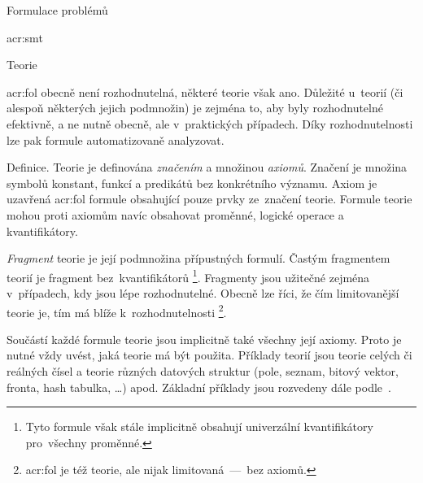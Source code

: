 \documentclass[thesis=M,czech]{FITthesis}[2012/06/26]
\newcommand{\acrlabel}[1]{acr:#1}
\newcommand{\acr}[1]{\acrshort{\acrlabel{#1}}}
\newcommand{\acrf}[1]{\acrfull{\acrlabel{#1}}}
\newcommand{\hl}[1]{\textit{#1}}
\newcommand{\name}[1]{\hl{#1}}
\newcommand{\cit}[1]{\cite{#1}}
\begin{document}
\begin{section}{Formulace problémů}
\begin{subsection}{\acrf{smt}}
\begin{subsubsection}{Teorie}

\bigskip

\acr{fol} obecně není rozhodnutelná,
některé teorie však ano.
Důležité u~teorií
(či alespoň některých jejich podmnožin)
je zejména to,
aby byly rozhodnutelné efektivně,
a ne nutně obecně,
ale v~praktických případech.
Díky rozhodnutelnosti lze pak formule
automatizovaně analyzovat.


\begin{paragraph}{Definice.}\label{p:theory:formulation:smt:theory:def}
Teorie je definována
\name{značením} a množinou \name{axiomů}.
Značení je množina symbolů konstant, funkcí a predikátů
bez konkrétního významu.
Axiom je uzavřená \acr{fol} formule
obsahující pouze prvky ze~značení teorie.
Formule teorie mohou proti axiomům
navíc obsahovat proměnné, logické operace
a kvantifikátory.
\end{paragraph} %


\bigskip

\name{Fragment} teorie je její podmnožina přípustných formulí.
Častým fragmentem teorií
je fragment bez~kvantifikátorů%
\footnote{Tyto formule však stále implicitně obsahují
univerzální kvantifikátory pro~všechny proměnné.}.
Fragmenty jsou užitečné zejména v~případech,
kdy jsou lépe rozhodnutelné.
Obecně lze říci,
že čím limitovanější teorie je,
tím má blíže k~rozhodnutelnosti%
\footnote{\acr{fol} je též teorie,
ale nijak limitovaná~---~bez axiomů.}.

Součástí každé formule teorie
jsou implicitně také všechny její axiomy.
Proto je nutné vždy uvést, jaká teorie má být použita.
Příklady teorií jsou teorie celých či reálných čísel
a teorie různých datových struktur
(pole, seznam, bitový vektor, fronta, hash tabulka, \dots)
apod. Základní příklady jsou rozvedeny dále podle~\cit{theories-book}.



\end{subsubsection}
\end{subsection}
\end{section}
\end{document}
